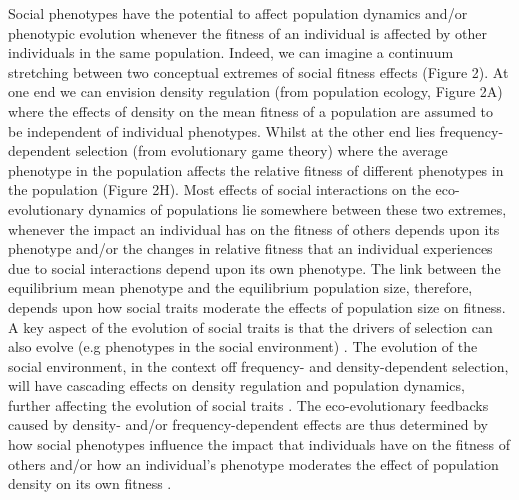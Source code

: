 \documentclass{article}
\begin{document}
Social phenotypes have the potential to affect population dynamics and/or phenotypic evolution whenever the fitness of an individual is affected by other individuals in the same population. Indeed, we can imagine a continuum stretching between two conceptual extremes of social fitness effects (Figure 2). At one end we can envision density regulation (from population ecology, Figure 2A) where the effects of density on the mean fitness of a population are assumed to be independent of individual phenotypes. Whilst at the other end lies frequency-dependent selection (from evolutionary game theory) where the average phenotype in the population affects the relative fitness of different phenotypes in the population (Figure 2H). Most effects of social interactions on the eco-evolutionary dynamics of populations lie somewhere between these two extremes, whenever the impact an individual has on the fitness of others depends upon its phenotype and/or the changes in relative fitness that an individual experiences due to social interactions depend upon its own phenotype. The link between the equilibrium mean phenotype and the equilibrium population size, therefore, depends upon how social traits moderate the effects of population size on fitness. A key aspect of the evolution of social traits is that the drivers of selection can also evolve (e.g phenotypes in the social environment) \citep{West-Eberhard1979, Moore1997}. The evolution of the social environment, in the context off frequency- and density-dependent selection, will have cascading effects on density regulation and population dynamics, further affecting the evolution of social traits \citep{Heino1998}. The eco-evolutionary feedbacks caused by density- and/or frequency-dependent effects are thus determined by how social phenotypes influence the impact that individuals have on the fitness of others and/or how an individual's phenotype moderates the effect of population density on its own fitness \citep{Engen2020}. 
\end{document}
